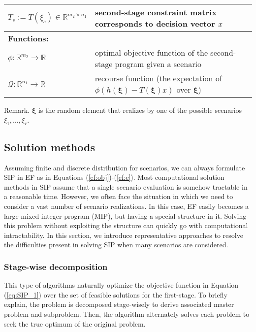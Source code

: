 \begin{table}[]
{\begin{threeparttable}
\begin{tabular}{ll}
				$T_s:= T(\xi_s)\in\mathbb{R}^{m_2\times n_1}$	& second-stage constraint matrix corresponds to decision vector $x$\\ \midrule
				\multicolumn{2}{l}{\textbf{Functions:}} \\
				$\phi:\mathbb{R}^{m_2}\to\mathbb{R}$	&  optimal objective function of the second-stage program given a scenario\\
				$\mathcal{Q}:\mathbb{R}^{n_1}\to\mathbb{R}$	& recourse function (the expectation of $\phi\left( h(\pmb{\xi})-T(\pmb{\xi})x \right)$ over $\pmb{\xi}$) 	\\
				\bottomrule
			\end{tabular}
			\begin{tablenotes}
			\small
			\item Remark. $\pmb{\xi}$ is the random element that realizes by one of the possible scenarios $\xi_1,\ldots,\xi_r$.		
			\end{tablenotes}
		\end{threeparttable}
	}
\end{table} 


\subsection{Solution methods}
Assuming finite and discrete distribution for scenarios, we can always formulate SIP in EF as in Equations (\ref{ef:obj})-(\ref{ef:e}).  %
Most computational solution methods in SIP assume that a single scenario evaluation is somehow tractable in a reasonable time. However, we often face the situation in which we need to consider a vast number of scenario realizations. In this case, EF easily becomes a large mixed integer program (MIP), but having a special structure in it. Solving this problem without exploiting the structure can quickly go with computational intractability. In this section, we introduce representative approaches to resolve the difficulties present in solving SIP when many scenarios are considered.

\subsubsection{Stage-wise decomposition}
This type of algorithms naturally optimize the objective function in Equation (\ref{eq:SIP_1}) over the set of feasible solutions for the first-stage. To briefly explain, the problem is decomposed stage-wisely to derive associated master problem and subproblem. Then, the algorithm alternately solves each problem to seek the true optimum of the original problem.
 
